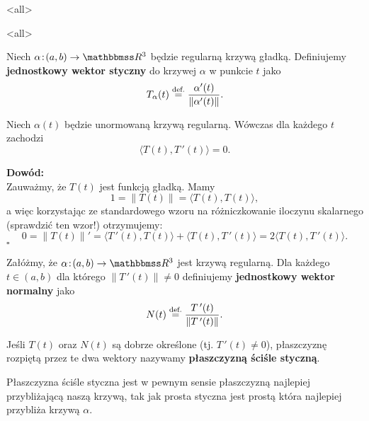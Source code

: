 \mode*
\mode<all>{}

\mode<all>{}
\begin{frame}[<+->]
\begin{definicja}
Niech $\alpha\colon (a,b)\to \R^3$ będzie regularną krzywą gładką. Definiujemy \textbf{jednostkowy wektor styczny} do krzywej $\alpha$ w punkcie $t$ jako \[T_\alpha(t)\define\frac{\alpha'(t)}{\|\alpha'(t)\|}.\]
\end{definicja}

\begin{center}
\begin{tikzpicture}[y=0.80pt, x=0.8pt,scale=0.5,yscale=-1, inner sep=0pt, outer sep=0pt]

\end{tikzpicture}
\end{center}

\end{frame}
\begin{frame}

\begin{lemat}
Niech $\alpha(t)$ będzie unormowaną krzywą regularną. Wówczas dla każdego $t$ zachodzi \[\langle T(t),T\,'(t)\rangle=0.\]
\end{lemat}

\pause\textcolor{ared}{\textbf{Dowód:}} \\
Zauważmy, że $T(t)$ jest funkcją gładką. Mamy \[1=\|T(t)\|=\langle T(t),T(t)\rangle,\]\pause a więc korzystając ze standardowego wzoru na różniczkowanie iloczynu skalarnego (sprawdzić ten wzor!) otrzymujemy:\pause\[0=\|T(t)\|'=\langle T\,'(t),T(t)\rangle+\langle T(t),T\,'(t)\rangle=2\langle T(t),T\,'(t)\rangle.\]
\hfill $\square$

\end{frame}
\begin{frame}

\begin{definicja}
Załóżmy, że $\alpha\colon (a,b)\to \R^3$ jest krzywą regularną. Dla każdego $t\in (a,b)$ dla którego $\|T\,'(t)\|\neq 0$ definiujemy \textbf{jednostkowy wektor normalny} jako \[N(t)\define \frac{T\,'(t)}{\|T\,'(t)\|}.\]

\pause Jeśli $T(t)$ oraz $N(t)$ są dobrze określone (tj. $T\,'(t)\neq 0$), płaszczyznę rozpiętą przez te dwa wektory nazywamy \textbf{płaszczyzną ściśle styczną}.
\end{definicja}
\medskip
\pause Płaszczyzna ściśle styczna jest w pewnym sensie płaszczyzną najlepiej przybliżającą naszą krzywą, tak jak prosta styczna jest prostą która najlepiej przybliża krzywą $\alpha$.

\end{frame}

